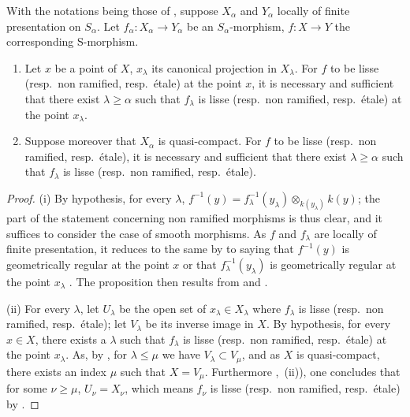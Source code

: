 \begin{proposition}[17.7.8]
\label{IV.17.7.8}
With the notations being those of , suppose $X_\alpha$ and $Y_\alpha$ locally of finite presentation on $S_\alpha$.
Let $f_\alpha:X_\alpha\to Y_\alpha$ be an $S_\alpha$-morphism, $f:X\to Y$ the corresponding S-morphism.
\begin{enumerate}[label=(\roman*)]
  \item Let $x$ be a point of $X$, $x_\lambda$ its canonical projection in $X_\lambda$.
  For $f$ to be lisse (resp.\ non ramified, resp.\ \'etale) at the point $x$, it is necessary and sufficient that there exist $\lambda\geq\alpha$ such that $f_\lambda$ is lisse (resp.\ non ramified, resp.\ \'etale) at the point $x_\lambda$.
  \item Suppose moreover that $X_\alpha$ is quasi-compact.
  For $f$ to be lisse (resp.\ non ramified, resp.\ \'etale), it is necessary and sufficient that there exist $\lambda\geq\alpha$ such that $f_\lambda$ is lisse (resp.\ non ramified, resp.\ \'etale).
\end{enumerate}
\end{proposition}

\begin{proof}
(i) By hypothesis, for every $\lambda$, $f^{-1}(y)=f_\lambda^{-1}(y_\lambda)\otimes_{k(y_\lambda)}k(y)$; the part of the statement concerning non ramified morphisms is thus clear, and it suffices to consider the case of smooth morphisms.
As $f$ and $f_\lambda$ are locally of finite presentation, it reduces to the same by  to saying that $f^{-1}(y)$ is geometrically regular at the point $x$ or that $f_\lambda^{-1}(y_\lambda)$ is geometrically regular at the point $x_\lambda$ .
The proposition then results from  and .

(ii) For every $\lambda$, let $U_\lambda$ be the open set of $x_\lambda\in X_\lambda$ where $f_\lambda$ is lisse (resp.\ non ramified, resp.\ \'etale); let $V_\lambda$ be its inverse image in $X$.
By hypothesis, for every $x\in X$, there exists a $\lambda$ such that $f_\lambda$ is lisse (resp.\ non ramified, resp.\ \'etale) at the point $x_\lambda$.
As, by , for $\lambda\leq\mu$ we have $V_\lambda\subset V_\mu$, and as $X$ is quasi-compact, there exists an index $\mu$ such that $X=V_\mu$.
Furthermore ,~(ii)), one concludes that for some $\nu\geq\mu$, $U_\nu=X_\nu$, which means $f_\nu$ is lisse (resp.\ non ramified, resp.\ \'etale) by .
\end{proof}

